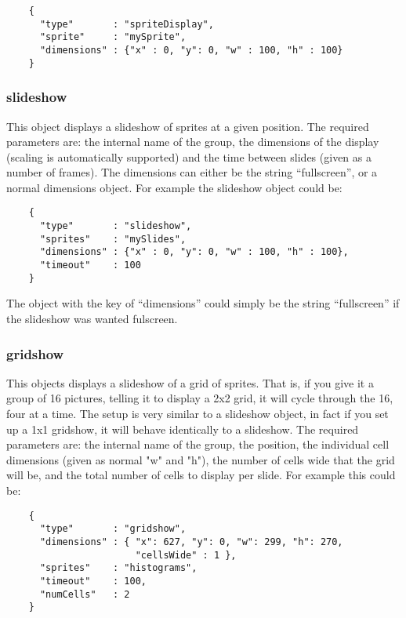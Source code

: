 \documentclass[a4paper]{article}
\begin{document}
  \begin{verbatim}
    {
      "type"       : "spriteDisplay",
      "sprite"     : "mySprite",
      "dimensions" : {"x" : 0, "y": 0, "w" : 100, "h" : 100}
    }
  \end{verbatim}

  \subsubsection{slideshow}
  This object displays a slideshow of sprites at a given position. The 
  required parameters are: the internal name of the group, the dimensions
  of the display (scaling is automatically supported) and the time between
  slides (given as a number of frames). The dimensions can either be the
  string ``fullscreen'', or a normal dimensions object. For example the
  slideshow object could be:

  \begin{verbatim}
    {
      "type"       : "slideshow",
      "sprites"    : "mySlides",
      "dimensions" : {"x" : 0, "y": 0, "w" : 100, "h" : 100},
      "timeout"    : 100
    }
  \end{verbatim}

  The object with the key of ``dimensions'' could simply be the string
  ``fullscreen'' if the slideshow was wanted fulscreen.

  \subsubsection{gridshow}
  This objects displays a slideshow of a grid of sprites. That is, if you
  give it a group of 16 pictures, telling it to display a 2x2 grid, it will
  cycle through the 16, four at a time. The setup is very similar to a
  slideshow object, in fact if you set up a 1x1 gridshow, it will behave
  identically to a slideshow.
  The required parameters are: the internal name of the group, the position,
  the individual cell dimensions (given as normal "w" and "h"), the number
  of cells wide that the grid will be, and the total number of cells to 
  display per slide. For example this could be:

  \begin{verbatim}
    {
      "type"       : "gridshow",
      "dimensions" : { "x": 627, "y": 0, "w": 299, "h": 270, 
                       "cellsWide" : 1 },
      "sprites"    : "histograms",
      "timeout"    : 100,
      "numCells"   : 2
    }  
  \end{verbatim}
\end{document}

